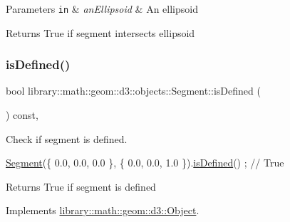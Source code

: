 \begin{DoxyParams}[1]{Parameters}
\mbox{\tt in}  & {\em an\+Ellipsoid} & An ellipsoid \\
\hline
\end{DoxyParams}
\begin{DoxyReturn}{Returns}
True if segment intersects ellipsoid 
\end{DoxyReturn}
\mbox{\label{classlibrary_1_1math_1_1geom_1_1d3_1_1objects_1_1_segment_a70a29c3822e4859a2e8cd4a52e1b26f5}} 
\subsubsection{\texorpdfstring{is\+Defined()}{isDefined()}}
{\footnotesize\ttfamily bool library\+::math\+::geom\+::d3\+::objects\+::\+Segment\+::is\+Defined (\begin{DoxyParamCaption}{ }\end{DoxyParamCaption}) const\hspace{0.3cm}{\ttfamily [override]}, {\ttfamily [virtual]}}



Check if segment is defined. 


\begin{DoxyCode}
\hyperlink{classlibrary_1_1math_1_1geom_1_1d3_1_1objects_1_1_segment_a5562342d1edf2f52e37ce1bc138ee7d7}{Segment}(\{ 0.0, 0.0, 0.0 \}, \{ 0.0, 0.0, 1.0 \}).\hyperlink{classlibrary_1_1math_1_1geom_1_1d3_1_1objects_1_1_segment_a70a29c3822e4859a2e8cd4a52e1b26f5}{isDefined}() ; \textcolor{comment}{// True}
\end{DoxyCode}


\begin{DoxyReturn}{Returns}
True if segment is defined 
\end{DoxyReturn}


Implements \hyperlink{classlibrary_1_1math_1_1geom_1_1d3_1_1_object_a2216442e322f0c3ca5f01a4efa22baf7}{library\+::math\+::geom\+::d3\+::\+Object}.

\mbox{\label{classlibrary_1_1math_1_1geom_1_1d3_1_1objects_1_1_segment_a11324bd27db3ef9d931fdee763246759}} 
